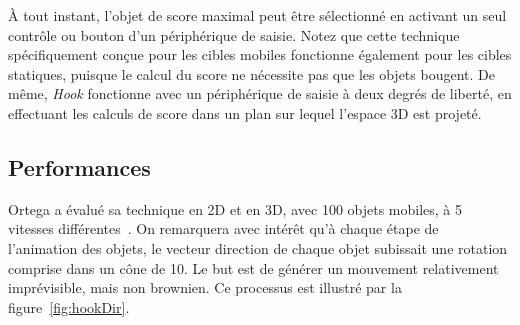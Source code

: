	À tout instant, l'objet de score maximal peut être sélectionné en activant un seul contrôle ou bouton d'un périphérique de saisie. Notez que cette technique spécifiquement conçue pour les cibles mobiles fonctionne également pour les cibles statiques, puisque le calcul du score ne nécessite pas que les objets bougent. De même, \emph{Hook} fonctionne avec un périphérique de saisie à deux degrés de liberté, en effectuant les calculs de score dans un plan sur lequel l'espace 3D est projeté.
	
	\subsection{Performances}
	Ortega a évalué sa technique en 2D et en 3D, avec 100 objets mobiles, à 5 vitesses différentes~\cite{ortega2013hook}. On remarquera avec intérêt qu'à chaque étape de l'animation des objets, le vecteur direction de chaque objet subissait une rotation comprise dans un cône de 10\textdegree. Le but est de générer un mouvement relativement imprévisible, mais non brownien. Ce processus est illustré par la figure~\ref{fig:hookDir}.
	
